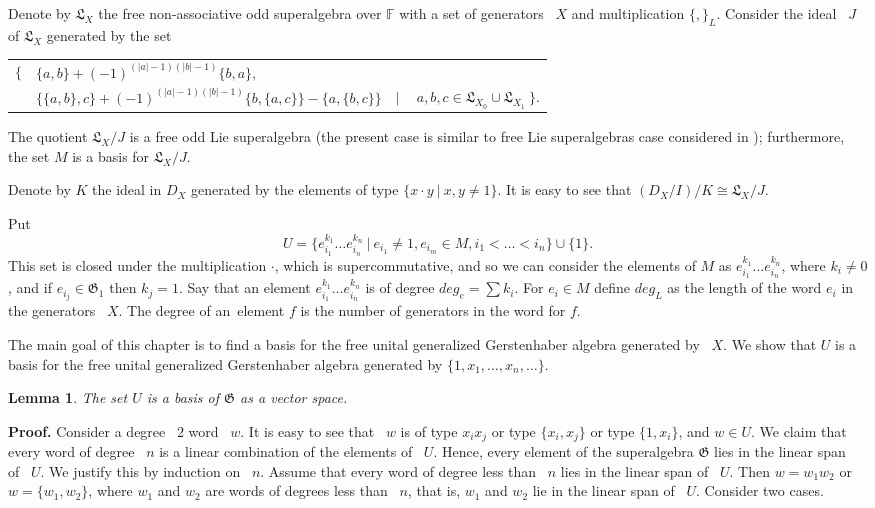 \documentclass[secthm,seceqn,amsthm,ussrhead,reqno,12pt]{amsart}
\theoremstyle{plain}
\newtheorem{lemma}[theorem]{Lemma}
\begin{document}
Denote by
${\mathfrak L}_X$
the free non-associative  odd superalgebra over 
$\mathbb{F}$
with a set of generators~%
$X$
and multiplication
$\{,\}_L$.
Consider the ideal~%
$J$
of %
${\mathfrak L}_X$
generated by the set
\begin{longtable}{llcl}
$\Big\{$ & $\{a,b\}+(-1)^{(|a|-1)(|b|-1)} \{b,a\},$\\
&$
\{\{a,b\},c\} +(-1)^{(|a|-1)(|b|-1)}\{b,\{a,c\}\}-\{a,\{b,c\}\}$ &$ | $&$ \ a,b,c \in {\mathfrak L}_{X_0} \cup  {\mathfrak L}_{X_1}   \   \Big\}.$
\end{longtable}
The quotient
${\mathfrak L}_X/J$
is a free odd Lie superalgebra (the present case is similar to free Lie superalgebras case considered in \cite{S86});
furthermore,
the set
$M$
is a basis for
${\mathfrak L}_X/J$.

Denote by
$K$
the ideal in
$D_X$
generated by the elements of type
$\{ x\cdot y \ |\  x,y \neq 1\}$. 
It is easy to see that
$(D_X/I)/K  \cong {\mathfrak L}_X/J$.

Put 
$$
U=\{ e_{i_1}^{k_1} \ldots e_{i_n}^{k_n} \ |\  e_{i_1} \neq 1, e_{i_m} \in M,  i_1 < \ldots < i_n \} \cup \{1\}.
$$
This set
is closed under the multiplication
$\cdot$,
which is supercommutative,
and so we can consider the elements of
$M$
as 
$e_{i_1}^{k_1} \ldots e_{i_n}^{k_n}$,
where
$k_i \neq 0$,
and if
$e_{i_j} \in{\mathfrak G}_1$
then
$k_j=1$.
Say that
an element
$e_{i_1}^{k_1} \ldots e_{i_n}^{k_n}$
is of degree
$deg_e=\sum k_i$.
For %
$e_i \in M$
define
$deg_L$
as the length of the word
$e_i$
in the generators~%
$X$.
The degree of an~element
$f$
is the number of generators in the word for
$f$.

The main goal of this chapter
is to find a basis for
the free unital generalized Gerstenhaber algebra 
generated by~%
$X$.
We show that
$U$
is a basis for the free unital generalized Gerstenhaber algebra
generated by
$\{1, x_1, \ldots, x_n, \ldots\}$.

\begin{lemma}\label{vsp}
	The set
	$U$
	is a basis of
	${\mathfrak G}$
	as a vector space.
\end{lemma}

{\bf Proof.}
Consider a degree~%
$2$
word~%
$w$.
It is easy to see that~%
$w$
is of type
$x_ix_j$
or type
$\{x_i,x_j\}$
or type
$\{1,x_i\}$,
and
$w \in U$.
We claim that
every word of degree~%
$n$
is a linear combination of the elements of~%
$U$.
Hence,
every element of the superalgebra
${\mathfrak G}$
lies in the linear span
of~%
$U$.
We justify this by induction on~%
$n$.
Assume that 
every word of degree less than~%
$n$
lies in the linear span
of~%
$U$.
Then
$w=w_1w_2$
or
$w=\{w_1,w_2\}$,
where
$w_1$
and
$w_2$
are words of degrees less than~%
$n$, 
that is,
$w_1$
and
$w_2$
lie in the linear span
of~%
$U$.
Consider two cases.
\end{document}
